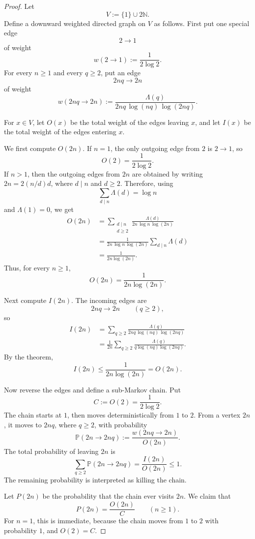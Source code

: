 \documentclass{amsart}
\begin{document}
\begin{proof}
Let
\[
V:=\{1\}\cup 2\mathbb N.
\]
Define a downward weighted directed graph on \(V\) as follows. First put one
special edge
\[
2\longrightarrow 1
\]
of weight
\[
w(2\to 1):=\frac{1}{2\log 2}.
\]
For every \(n\ge 1\) and every \(q\ge 2\), put an edge
\[
2nq\longrightarrow 2n
\]
of weight
\[
w(2nq\to 2n)
:=
\frac{\Lambda(q)}
{2nq\,\log(nq)\,\log(2nq)}.
\]

For \(x\in V\), let \(O(x)\) be the total weight of the edges leaving \(x\),
and let \(I(x)\) be the total weight of the edges entering \(x\).

We first compute \(O(2n)\). If \(n=1\), the only outgoing edge from \(2\) is
\(2\to 1\), so
\[
O(2)=\frac{1}{2\log 2}.
\]
If \(n>1\), then the outgoing edges from \(2n\) are obtained by writing
\(2n=2(n/d)d\), where \(d\mid n\) and \(d\ge 2\). Therefore, using
\[
\sum_{d\mid n}\Lambda(d)=\log n
\]
and \(\Lambda(1)=0\), we get
\[
\begin{aligned}
O(2n)
&=
\sum_{\substack{d\mid n\\ d\ge 2}}
\frac{\Lambda(d)}
{2n\,\log n\,\log(2n)}  \\
&=
\frac{1}{2n\,\log n\,\log(2n)}
\sum_{d\mid n}\Lambda(d)  \\
&=
\frac{1}{2n\log(2n)}.
\end{aligned}
\]
Thus, for every \(n\ge 1\),
\[
O(2n)=\frac{1}{2n\log(2n)}.
\]

Next compute \(I(2n)\). The incoming edges are
\[
2nq\longrightarrow 2n
\qquad(q\ge 2),
\]
so
\[
\begin{aligned}
I(2n)
&=
\sum_{q\ge 2}
\frac{\Lambda(q)}
{2nq\,\log(nq)\,\log(2nq)}  \\
&=
\frac{1}{2n}
\sum_{q\ge 2}
\frac{\Lambda(q)}
{q\log(nq)\log(2nq)}.
\end{aligned}
\]
By the theorem,
\[
I(2n)
\le
\frac{1}{2n\log(2n)}
=
O(2n).
\]

Now reverse the edges and define a sub-Markov chain. Put
\[
C:=O(2)=\frac{1}{2\log 2}.
\]
The chain starts at \(1\), then moves deterministically from \(1\) to \(2\).
From a vertex \(2n\), it moves to \(2nq\), where \(q\ge 2\), with probability
\[
\mathbb P(2n\to 2nq)
:=
\frac{w(2nq\to 2n)}{O(2n)}.
\]
The total probability of leaving \(2n\) is
\[
\sum_{q\ge 2}\mathbb P(2n\to 2nq)
=
\frac{I(2n)}{O(2n)}
\le 1.
\]
The remaining probability is interpreted as killing the chain.

Let \(P(2n)\) be the probability that the chain ever visits \(2n\). We claim
that
\[
P(2n)=\frac{O(2n)}{C}
\qquad(n\ge 1).
\]
For \(n=1\), this is immediate, because the chain moves from \(1\) to \(2\)
with probability \(1\), and \(O(2)=C\).


\end{proof}
\end{document}
